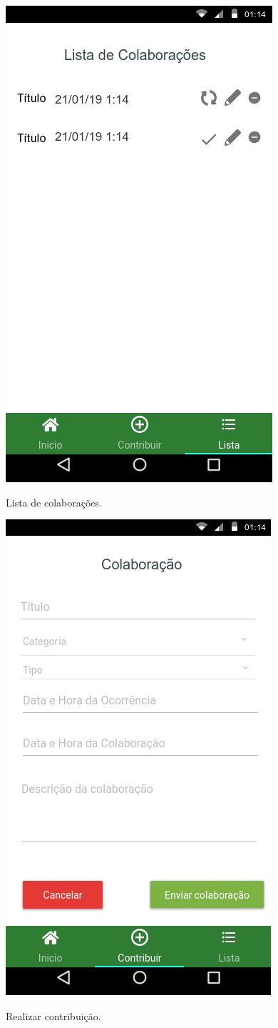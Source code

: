     \begin{figure}[H]
    	\centering
    	\caption{Lista de colaborações.}	
    	\includegraphics[width=0.6\linewidth, frame]{Imagens/protList.png}
    	\label{fig:protList}
    \end{figure}
    
    \begin{figure}[H]
    	\centering
    	\caption{Realizar contribuição.}	
    	\includegraphics[width=0.6\linewidth, frame]{Imagens/protColab.png}
    	\label{fig:protColab}
    \end{figure}
    
